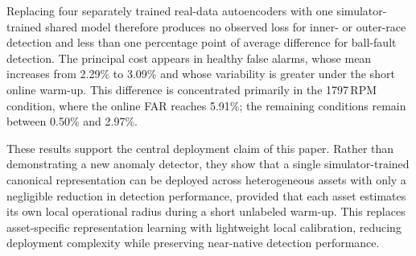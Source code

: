 \documentclass[11pt,a4paper]{article}
\begin{document}
\begin{table}[H]
\centering
\caption{Ideal but non-scalable asset-specific deployment versus the proposed fleet-scalable
deployment. Values are mean $\pm$ standard deviation across the four CWRU operating
conditions.}
\label{tab:oracle-vs-proposed}
\end{table}

Replacing four separately trained real-data autoencoders with one simulator-trained shared model
therefore produces no observed loss for inner- or outer-race detection and less than one
percentage point of average difference for ball-fault detection. The principal cost appears in
healthy false alarms, whose mean increases from 2.29\% to 3.09\% and whose variability is
greater under the short online warm-up. This difference is concentrated primarily in the
1797\,RPM condition, where the online FAR reaches 5.91\%; the remaining conditions remain
between 0.50\% and 2.97\%.

These results support the central deployment claim of this paper. Rather than demonstrating a
new anomaly detector, they show that a single simulator-trained canonical representation can be
deployed across heterogeneous assets with only a negligible reduction in detection performance,
provided that each asset estimates its own local operational radius during a short unlabeled
warm-up. This replaces asset-specific representation learning with lightweight local calibration,
reducing deployment complexity while preserving near-native detection performance.
\end{document}

